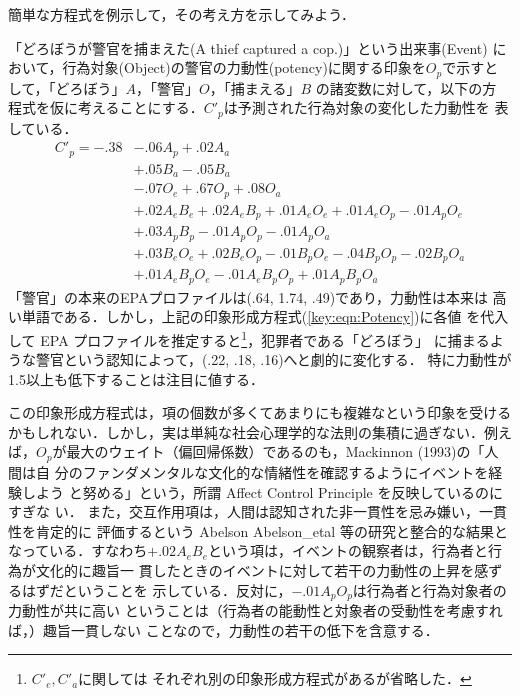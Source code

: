 \documentclass[japanese]{jnlp_1.3d}
\newcommand{\citep}{}
\begin{document}
簡単な方程式を例示して，その考え方を示してみよう．

「どろぼうが警官を捕まえた(A thief captured a cop.)」という出来事(Event)
において，行為対象(Object)の警官の力動性(potency)に関する印象を$O_p$で示すと
して，「どろぼう」$A$，「警官」$O$，「捕まえる」$B$ の諸変数に対して，以下の方
程式を仮に考えることにする．$C'_p$は予測された行為対象の変化した力動性を
表している．
\begin{align}
 C'_p  =  -.38 & -.06 A_p + .02 A_a  \nonumber \\ 
        & + .05B_a -.05 B_a         \nonumber \\ 
        & - .07 O_e +.67 O_p +.08 O_a    \nonumber     \\ 
        & + .02 A_e B_e + .02 A_e B_p + .01 A_e O_e + .01 A_e O_p -.01
     A_p O_e \nonumber \\ 
        & + .03 A_p B_p -.01A_p O_p -.01 A_p O_a \nonumber \\  
        & +.03 B_e O_e +.02 B_e O_p -.01 B_p O_e -.04 B_p O_p -
     .02 B_p O_a \nonumber \\ 
        &  + .01 A_e B_p O_e - .01 A_e B_p O_p + .01 A_p B_p O_a  
	\label{key:eqn:Potency} 
 \end{align}
「警官」の本来のEPAプロファイルは(.64, 1.74, .49)であり，力動性は本来は
高い単語である．しかし，上記の印象形成方程式(\ref{key:eqn:Potency})に各値
を代入して EPA プロファイルを推定すると\footnote{$C'_e, C'_a$に関しては
それぞれ別の印象形成方程式があるが省略した．}，犯罪者である「どろぼう」
に捕まるような警官という認知によって，(.22, .18, .16)へと劇的に変化する．
特に力動性が1.5以上も低下することは注目に値する．

この印象形成方程式は，項の個数が多くてあまりにも複雑なという印象を受ける
かもしれない．しかし，実は単純な社会心理学的な法則の集積に過ぎない．例え
ば，$O_p$が最大のウェイト（偏回帰係数）であるのも，Mackinnon (1993)の「人間は自
分のファンダメンタルな文化的な情緒性を確認するようにイベントを経験しよう
と努める」という，所謂 Affect Control Principle を反映しているのにすぎな
い．
また，交互作用項は，人間は認知された非一貫性を忌み嫌い，一貫性を肯定的に
評価するという Abelson \citep{Abelson_etal} 等の研究と整合的な結果となっている．すなわち$+
.02 A_e B_e$という項は，イベントの観察者は，行為者と行為が文化的に趣旨一
貫したときのイベントに対して若干の力動性の上昇を感ずるはずだということを
示している．反対に，$-.01A_p O_p$は行為者と行為対象者の力動性が共に高い
ということは（行為者の能動性と対象者の受動性を考慮すれば，）趣旨一貫しない
ことなので，力動性の若干の低下を含意する．
\end{document}
